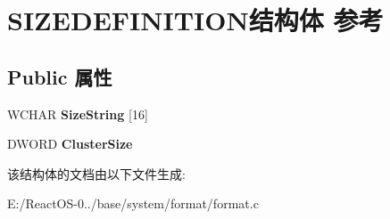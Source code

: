 \hypertarget{struct_s_i_z_e_d_e_f_i_n_i_t_i_o_n}{}\section{S\+I\+Z\+E\+D\+E\+F\+I\+N\+I\+T\+I\+O\+N结构体 参考}
\label{struct_s_i_z_e_d_e_f_i_n_i_t_i_o_n}
\subsection*{Public 属性}
\begin{DoxyCompactItemize}
\item 
\mbox{\label{struct_s_i_z_e_d_e_f_i_n_i_t_i_o_n_a882738f4bf63aba2fbbd2d9f3906cc77}} 
W\+C\+H\+AR {\bfseries Size\+String} \mbox{[}16\mbox{]}
\item 
\mbox{\label{struct_s_i_z_e_d_e_f_i_n_i_t_i_o_n_a6448c36bca4f158541b015f8f454b594}} 
D\+W\+O\+RD {\bfseries Cluster\+Size}
\end{DoxyCompactItemize}


该结构体的文档由以下文件生成\+:\begin{DoxyCompactItemize}
\item 
E\+:/\+React\+O\+S-\/0../base/system/format/format.\+c\end{DoxyCompactItemize}
